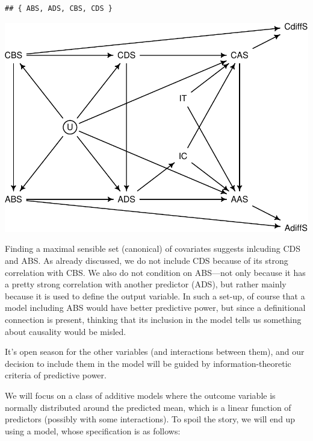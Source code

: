 \documentclass[10pt,dvipsnames,enabledeprecatedfontcommands]{scrartcl}
\begin{document}
\begin{verbatim}
## { ABS, ADS, CBS, CDS }
\end{verbatim}

\begin{center}\includegraphics[width=0.8\linewidth]{bayesianReport3_files/figure-latex/dag2-1} \end{center}

Finding a maximal sensible set (canonical) of covariates suggests
inlcuding \textsf{CDS} and \textsf{ABS}. As already discussed, we do not
include \textsf{CDS} because of its strong correlation with
\textsf{CBS}. We also do not condition on \textsf{ABS}---not only
because it has a pretty strong correlation with another predictor
(\textsf{ADS}), but rather mainly because it is used to define the
output variable. In such a set-up, of course that a model including
\textsf{ABS} would have better predictive power, but since a
definitional connection is present, thinking that its inclusion in the
model tells us something about causality would be misled.

It's open season for the other variables (and interactions between
them), and our decision to include them in the model will be guided by
information-theoretic criteria of predictive power.

We will focus on a class of additive models where the outcome variable
is normally distributed around the predicted mean, which is a linear
function of predictors (possibly with some interactions). To spoil the
story, we will end up using a model, whose specification is as follows:
\end{document}

